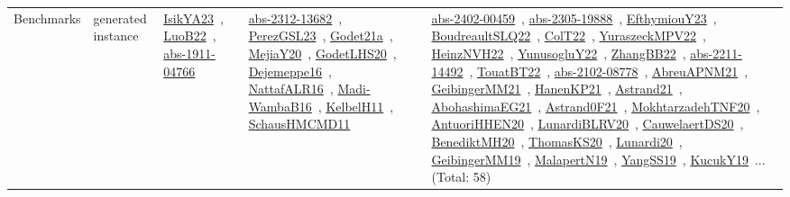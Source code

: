 {\begin{longtable}{lp{3cm}>{\raggedright\arraybackslash}p{6cm}>{\raggedright\arraybackslash}p{6cm}>{\raggedright\arraybackslash}p{8cm}}
Benchmarks & generated instance & \href{works/IsikYA23.pdf}{IsikYA23}~\cite{IsikYA23}, \href{works/LuoB22.pdf}{LuoB22}~\cite{LuoB22}, \href{works/abs-1911-04766.pdf}{abs-1911-04766}~\cite{abs-1911-04766} & \href{works/abs-2312-13682.pdf}{abs-2312-13682}~\cite{abs-2312-13682}, \href{works/PerezGSL23.pdf}{PerezGSL23}~\cite{PerezGSL23}, \href{works/Godet21a.pdf}{Godet21a}~\cite{Godet21a}, \href{works/MejiaY20.pdf}{MejiaY20}~\cite{MejiaY20}, \href{works/GodetLHS20.pdf}{GodetLHS20}~\cite{GodetLHS20}, \href{works/Dejemeppe16.pdf}{Dejemeppe16}~\cite{Dejemeppe16}, \href{works/NattafALR16.pdf}{NattafALR16}~\cite{NattafALR16}, \href{works/Madi-WambaB16.pdf}{Madi-WambaB16}~\cite{Madi-WambaB16}, \href{works/KelbelH11.pdf}{KelbelH11}~\cite{KelbelH11}, \href{works/SchausHMCMD11.pdf}{SchausHMCMD11}~\cite{SchausHMCMD11} & \href{works/abs-2402-00459.pdf}{abs-2402-00459}~\cite{abs-2402-00459}, \href{works/abs-2305-19888.pdf}{abs-2305-19888}~\cite{abs-2305-19888}, \href{works/EfthymiouY23.pdf}{EfthymiouY23}~\cite{EfthymiouY23}, \href{works/BoudreaultSLQ22.pdf}{BoudreaultSLQ22}~\cite{BoudreaultSLQ22}, \href{works/ColT22.pdf}{ColT22}~\cite{ColT22}, \href{works/YuraszeckMPV22.pdf}{YuraszeckMPV22}~\cite{YuraszeckMPV22}, \href{works/HeinzNVH22.pdf}{HeinzNVH22}~\cite{HeinzNVH22}, \href{works/YunusogluY22.pdf}{YunusogluY22}~\cite{YunusogluY22}, \href{works/ZhangBB22.pdf}{ZhangBB22}~\cite{ZhangBB22}, \href{works/abs-2211-14492.pdf}{abs-2211-14492}~\cite{abs-2211-14492}, \href{works/TouatBT22.pdf}{TouatBT22}~\cite{TouatBT22}, \href{works/abs-2102-08778.pdf}{abs-2102-08778}~\cite{abs-2102-08778}, \href{works/AbreuAPNM21.pdf}{AbreuAPNM21}~\cite{AbreuAPNM21}, \href{works/GeibingerMM21.pdf}{GeibingerMM21}~\cite{GeibingerMM21}, \href{works/HanenKP21.pdf}{HanenKP21}~\cite{HanenKP21}, \href{works/Astrand21.pdf}{Astrand21}~\cite{Astrand21}, \href{works/AbohashimaEG21.pdf}{AbohashimaEG21}~\cite{AbohashimaEG21}, \href{works/Astrand0F21.pdf}{Astrand0F21}~\cite{Astrand0F21}, \href{works/MokhtarzadehTNF20.pdf}{MokhtarzadehTNF20}~\cite{MokhtarzadehTNF20}, \href{works/AntuoriHHEN20.pdf}{AntuoriHHEN20}~\cite{AntuoriHHEN20}, \href{works/LunardiBLRV20.pdf}{LunardiBLRV20}~\cite{LunardiBLRV20}, \href{works/CauwelaertDS20.pdf}{CauwelaertDS20}~\cite{CauwelaertDS20}, \href{works/BenediktMH20.pdf}{BenediktMH20}~\cite{BenediktMH20}, \href{works/ThomasKS20.pdf}{ThomasKS20}~\cite{ThomasKS20}, \href{works/Lunardi20.pdf}{Lunardi20}~\cite{Lunardi20}, \href{works/GeibingerMM19.pdf}{GeibingerMM19}~\cite{GeibingerMM19}, \href{works/MalapertN19.pdf}{MalapertN19}~\cite{MalapertN19}, \href{works/YangSS19.pdf}{YangSS19}~\cite{YangSS19}, \href{works/KucukY19.pdf}{KucukY19}~\cite{KucukY19}... (Total: 58)\\

\end{longtable}}
